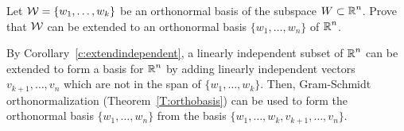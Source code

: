 \documentclass{ximera}
\begin{document}
\begin{exercise} \label{c7.5.3}
Let ${\cal W}=\{w_1,\ldots,w_k\}$ be an orthonormal basis of the subspace
$W\subset\mbox{$\mathbb{R}$}^n$.  Prove that ${\cal W}$ can be extended to an orthonormal
basis $\{w_1,\ldots,w_n\}$ of $\mbox{$\mathbb{R}$}^n$.

\begin{solution}

By Corollary~\ref{c:extendindependent},
a linearly independent subset of $\mbox{$\mathbb{R}$}^n$ can be extended to form a
basis for $\mbox{$\mathbb{R}$}^n$ by adding linearly independent vectors
$v_{k+1},\ldots,v_n$ which are not in the span of
$\{w_1,\ldots,w_k\}$.  Then, Gram-Schmidt orthonormalization
(Theorem~\ref{T:orthobasis}) can be used
to form the orthonormal basis $\{w_1,\ldots,w_n\}$ from the basis
$\{w_1,\ldots,w_k,v_{k+1},\ldots,v_n\}$.

\end{solution}
\end{exercise}
\end{document}
